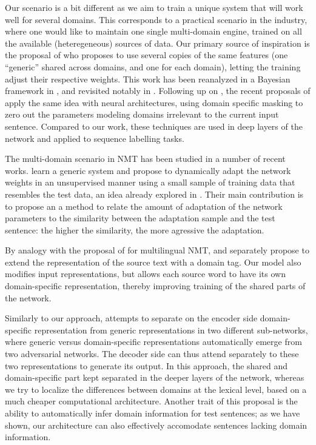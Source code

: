 \documentclass[11pt,a4paper]{article}
\newcommand{\fyTodo}[1]{\Todo[FY:]{\textcolor{orange}{#1}}}
\begin{document}
Our scenario is a bit different as we aim to train a unique system that will work well for several domains. This corresponds to a practical scenario in the industry, where one would like to maintain one single multi-domain engine, trained on all the available (heteregeneous) sources of data. Our primary source of inspiration is the proposal of \citet{Daume07frustratingly} who proposes to use several copies of the same features (one ``generic'' shared across domains, and one for each domain), letting the training adjust their respective weights. This work has been reanalyzed in a Bayesian framework in \cite{Finkel09hierarchical}, and revisited notably in \cite{Chang10necessity}. Following up on \cite{Yang15unified}, the recent proposals of \cite{Peng17multitask} apply the same idea with neural architectures, using domain specific masking to zero out the parameters modeling domains irrelevant to the current input sentence. Compared to our work, these techniques are used in deep layers of the network and applied to sequence labelling tasks.

The multi-domain scenario in NMT has been studied in a number of recent works. \citet{Farajian17multidomain} learn a generic system and propose to dynamically adapt the network weights in an unsupervised manner using a small sample of training data that resembles the test data, an idea already explored in \cite{Sennrich13multidomain}. Their main contribution is to propose an a method to relate the amount of adaptation of the network parameters to the similarity between the adaptation sample and the test sentence: the higher the similarity, the more agressive the adaptation.

By analogy with the proposal of \citet{Johnson17google} for multilingual NMT, \citet{Kobus17domaincontrol} and \citet{Chu18multilingual} separately propose to extend the representation of the source text with a domain tag. Our model also modifies input representations, but allows each source word to have its own domain-specific representation, thereby improving training of the shared parts of the network.\fyTodo{Talk about target embeddings somewhere.} 

Similarly to our approach, \cite{Zeng18multidomain} attempts to separate on the encoder side domain-specific representation from generic representations in two different sub-networks, where generic versus domain-specific representations automatically emerge from two adversarial networks. The decoder side can thus attend separately to these two representations to generate its output. In this approach, the shared and domain-specific part kept separated in the deeper layers of the network, whereas we try to localize the differences between domains at the lexical level, based on a much cheaper computational architecture. Another trait of this proposal is the ability to automatically infer domain information for test sentences; as we have shown, our architecture can also effectively accomodate sentences lacking domain information.
\end{document}
